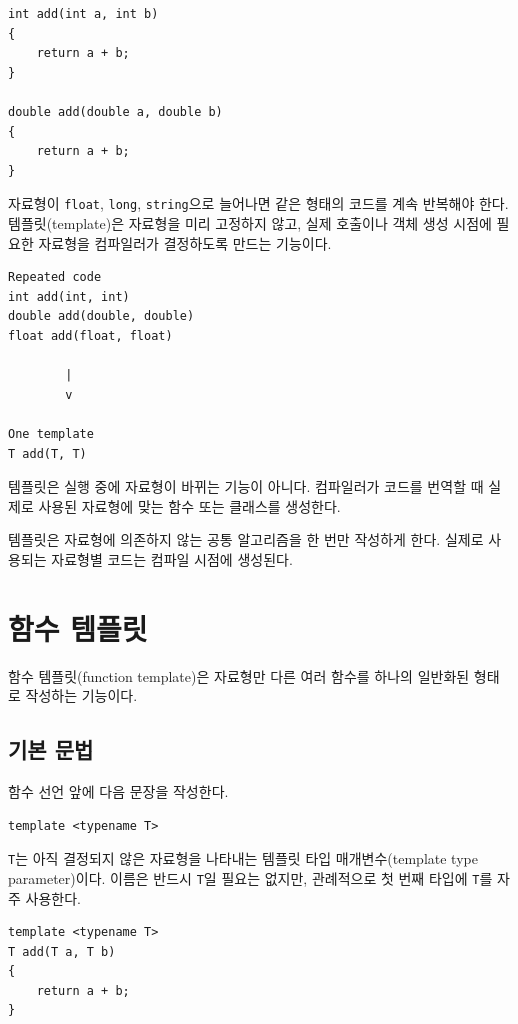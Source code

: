 \documentclass[11pt,a4paper]{article}
\begin{document}
\begin{lstlisting}
int add(int a, int b)
{
    return a + b;
}

double add(double a, double b)
{
    return a + b;
}
\end{lstlisting}

자료형이 \texttt{float}, \texttt{long}, \texttt{string}으로 늘어나면 같은 형태의 코드를 계속 반복해야 한다. 템플릿(template)은 자료형을 미리 고정하지 않고, 실제 호출이나 객체 생성 시점에 필요한 자료형을 컴파일러가 결정하도록 만드는 기능이다.

\begin{verbatim}
Repeated code
int add(int, int)
double add(double, double)
float add(float, float)

        |
        v

One template
T add(T, T)
\end{verbatim}

템플릿은 실행 중에 자료형이 바뀌는 기능이 아니다. 컴파일러가 코드를 번역할 때 실제로 사용된 자료형에 맞는 함수 또는 클래스를 생성한다.

\begin{importantbox}
템플릿은 자료형에 의존하지 않는 공통 알고리즘을 한 번만 작성하게 한다. 실제로 사용되는 자료형별 코드는 컴파일 시점에 생성된다.
\end{importantbox}

\section{함수 템플릿}
함수 템플릿(function template)은 자료형만 다른 여러 함수를 하나의 일반화된 형태로 작성하는 기능이다.

\subsection{기본 문법}
함수 선언 앞에 다음 문장을 작성한다.

\begin{lstlisting}
template <typename T>
\end{lstlisting}

\texttt{T}는 아직 결정되지 않은 자료형을 나타내는 템플릿 타입 매개변수(template type parameter)이다. 이름은 반드시 \texttt{T}일 필요는 없지만, 관례적으로 첫 번째 타입에 \texttt{T}를 자주 사용한다.

\begin{lstlisting}
template <typename T>
T add(T a, T b)
{
    return a + b;
}
\end{lstlisting}
\end{document}
